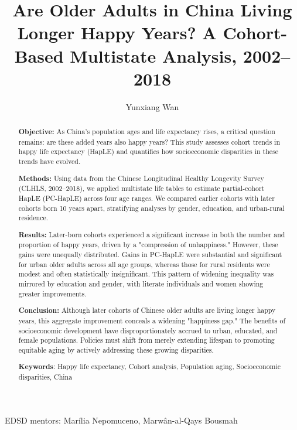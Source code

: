 \documentclass[12pt, a4paper]{article}
\title{\textbf{Are Older Adults in China Living Longer Happy Years? A Cohort-Based Multistate Analysis, 2002–2018}}
\author[]{Yunxiang Wan} %
\date{}
\begin{document}
\newpage

\maketitle

\begin{center}
  {EDSD mentors: Marília Nepomuceno, Marwân-al-Qays Bousmah}
\end{center}
\vspace{1em}

\begin{abstract}
  \noindent\textbf{Objective:} As China’s population ages and life expectancy rises, a critical question remains: are these added years also happy years? This study assesses cohort trends in happy life expectancy (HapLE) and quantifies how socioeconomic disparities in these trends have evolved.

  \noindent\textbf{Methods:} Using data from the Chinese Longitudinal Healthy Longevity Survey (CLHLS, 2002–2018), we applied multistate life tables to estimate partial-cohort HapLE (PC-HapLE) across four age ranges. We compared earlier cohorts with later cohorts born 10 years apart, stratifying analyses by gender, education, and urban-rural residence.

  \noindent\textbf{Results:} Later-born cohorts experienced a significant increase in both the number and proportion of happy years, driven by a "compression of unhappiness." However, these gains were unequally distributed. Gains in PC-HapLE were substantial and significant for urban older adults across all age groups, whereas those for rural residents were modest and often statistically insignificant. This pattern of widening inequality was mirrored by education and gender, with literate individuals and women showing greater improvements.

  \noindent\textbf{Conclusion:} Although later cohorts of Chinese older adults are living longer happy years, this aggregate improvement conceals a widening "happiness gap." The benefits of socioeconomic development have disproportionately accrued to urban, educated, and female populations. Policies must shift from merely extending lifespan to promoting equitable aging by actively addressing these growing disparities.
  \vspace{1em}

  \noindent\textbf{Keywords}: Happy life expectancy, Cohort analysis, Population aging, Socioeconomic disparities, China
\end{abstract}
\end{document}
